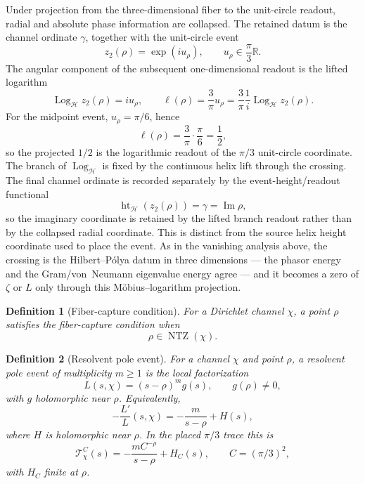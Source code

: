 \documentclass[11pt]{article}
\newtheorem{definition}{Definition}[section]
\DeclareMathOperator{\Imm}{Im}
\DeclareMathOperator{\NTZ}{NTZ}
\DeclareMathOperator{\Log}{Log}
\DeclareMathOperator{\hgt}{ht}
\begin{document}
Under projection from the three-dimensional fiber to the unit-circle readout,
radial and absolute phase information are collapsed.  The retained datum is the
channel ordinate $\gamma$, together with the unit-circle event
\[
  z_2(\rho)=\exp(iu_\rho),\qquad u_\rho\in\frac{\pi}{3}\mathbb R .
\]
The angular component of the subsequent one-dimensional readout is the lifted
logarithm
\[
  \Log_{\mathcal H} z_2(\rho)=iu_\rho,
  \qquad
  \ell(\rho)=\frac{3}{\pi}u_\rho
    =
    \frac{3}{\pi}\frac{1}{i}\Log_{\mathcal H}z_2(\rho).
\]
For the midpoint event, $u_\rho=\pi/6$, hence
\[
  \ell(\rho)=\frac{3}{\pi}\cdot\frac{\pi}{6}=\frac12,
\]
so the projected $1/2$ is the logarithmic readout of the $\pi/3$ unit-circle
coordinate.  The branch of $\Log_{\mathcal H}$ is fixed by the continuous helix
lift through the crossing.  The final channel ordinate is recorded separately by
the event-height/readout functional
\[
  \hgt_{\mathcal H}(z_2(\rho))=\gamma=\Imm\rho,
\]
so the imaginary coordinate is retained by the lifted branch readout rather
than by the collapsed radial coordinate.  This is distinct from the source
helix height coordinate used to place the event.  As in the vanishing analysis
above, the crossing is the Hilbert--Pólya datum in three dimensions --- the
phasor energy and the Gram/von~Neumann eigenvalue energy agree --- and it
becomes a zero of $\zeta$ or $L$ only through this Möbius--logarithm projection.

\begin{definition}[Fiber-capture condition]
For a Dirichlet channel $\chi$, a point $\rho$ satisfies the
\emph{fiber-capture condition} when
\[
  \rho\in\NTZ(\chi).
\]
\end{definition}

\begin{definition}[Resolvent pole event]
For a channel $\chi$ and point $\rho$, a resolvent pole event of multiplicity
$m\ge1$ is the local factorization
\[
  L(s,\chi)=(s-\rho)^m g(s),\qquad g(\rho)\ne0,
\]
with $g$ holomorphic near $\rho$.  Equivalently,
\[
  -\frac{L'}{L}(s,\chi)
  =
  -\frac{m}{s-\rho}+H(s),
\]
where $H$ is holomorphic near $\rho$.  In the placed $\pi/3$ trace this is
\[
  \mathcal T_\chi^C(s)
  =
  -\frac{mC^{-\rho}}{s-\rho}
  +H_C(s),
  \qquad C=(\pi/3)^2,
\]
with $H_C$ finite at $\rho$.
\end{definition}
\end{document}
